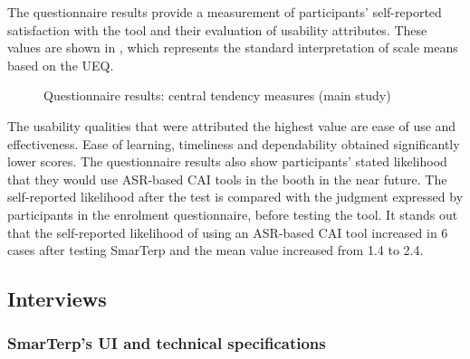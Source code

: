 The questionnaire results provide a measurement of participants’ self-reported satisfaction with the tool and their evaluation of usability attributes. These values are shown in , which represents the standard interpretation of scale means based on the UEQ.

\begin{figure}\small
    \caption{Questionnaire results: central tendency measures (main study)\label{fig:9}}
\end{figure}

The usability qualities that were attributed the highest value are ease of use and effectiveness. Ease of learning, timeliness and dependability obtained significantly lower scores. The questionnaire results also show participants’ stated likelihood that they would use ASR-based CAI tools in the booth in the near future. The self-reported likelihood after the test is compared with the judgment expressed by participants in the enrolment questionnaire, before testing the tool. It stands out that the self-reported likelihood of using an ASR-based CAI tool increased in 6 cases after testing SmarTerp and the mean value increased from 1.4 to 2.4.




\subsection{Interviews}

\subsubsection{SmarTerp’s UI and technical specifications}

